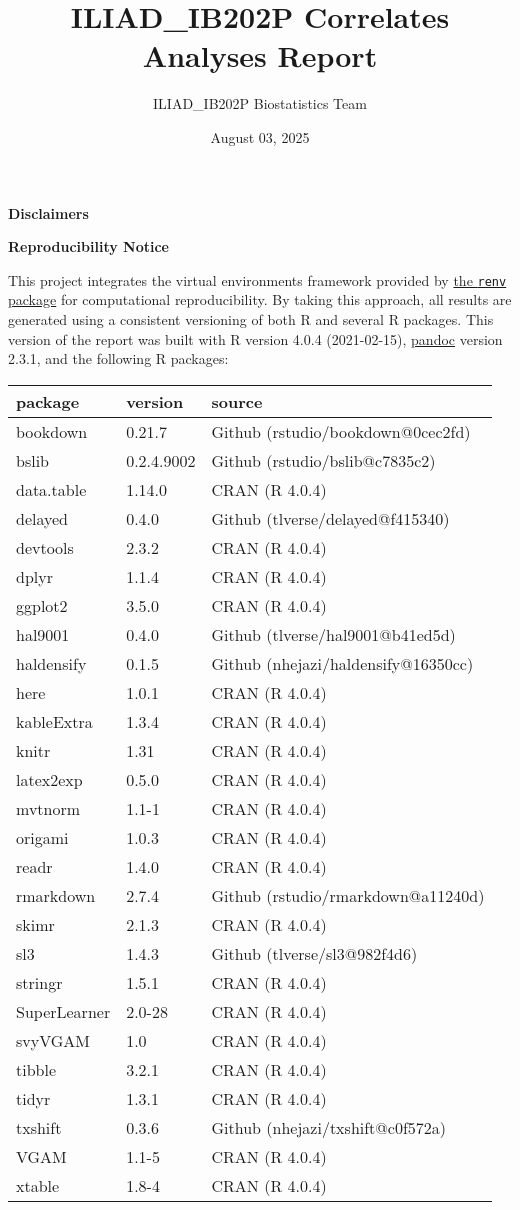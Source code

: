 \documentclass[]{book}
\title{ILIAD\_IB202P Correlates Analyses Report}
\author{ILIAD\_IB202P Biostatistics Team}
\date{August 03, 2025}
\begin{document}
\maketitle

{
\hypersetup{linkcolor=}
\setcounter{tocdepth}{4}
\tableofcontents
}
\listoftables
\listoffigures
\textbf{Disclaimers}

\textbf{Reproducibility Notice}

This project integrates the virtual environments framework provided by \href{https://rstudio.github.io/renv/}{the
\texttt{renv} package} for computational
reproducibility. By taking this approach, all results are generated using a
consistent versioning of both R and several R packages. This version of the
report was built with R version 4.0.4 (2021-02-15), \href{https://pandoc.org/}{pandoc}
version 2.3.1, and the following R packages:

\begin{longtable}[]{@{}lll@{}}
\toprule
package & version & source\tabularnewline
\midrule
\endhead
bookdown & 0.21.7 & Github (rstudio/bookdown@0cec2fd)\tabularnewline
bslib & 0.2.4.9002 & Github (rstudio/bslib@c7835c2)\tabularnewline
data.table & 1.14.0 & CRAN (R 4.0.4)\tabularnewline
delayed & 0.4.0 & Github (tlverse/delayed@f415340)\tabularnewline
devtools & 2.3.2 & CRAN (R 4.0.4)\tabularnewline
dplyr & 1.1.4 & CRAN (R 4.0.4)\tabularnewline
ggplot2 & 3.5.0 & CRAN (R 4.0.4)\tabularnewline
hal9001 & 0.4.0 & Github (tlverse/hal9001@b41ed5d)\tabularnewline
haldensify & 0.1.5 & Github (nhejazi/haldensify@16350cc)\tabularnewline
here & 1.0.1 & CRAN (R 4.0.4)\tabularnewline
kableExtra & 1.3.4 & CRAN (R 4.0.4)\tabularnewline
knitr & 1.31 & CRAN (R 4.0.4)\tabularnewline
latex2exp & 0.5.0 & CRAN (R 4.0.4)\tabularnewline
mvtnorm & 1.1-1 & CRAN (R 4.0.4)\tabularnewline
origami & 1.0.3 & CRAN (R 4.0.4)\tabularnewline
readr & 1.4.0 & CRAN (R 4.0.4)\tabularnewline
rmarkdown & 2.7.4 & Github (rstudio/rmarkdown@a11240d)\tabularnewline
skimr & 2.1.3 & CRAN (R 4.0.4)\tabularnewline
sl3 & 1.4.3 & Github (tlverse/sl3@982f4d6)\tabularnewline
stringr & 1.5.1 & CRAN (R 4.0.4)\tabularnewline
SuperLearner & 2.0-28 & CRAN (R 4.0.4)\tabularnewline
svyVGAM & 1.0 & CRAN (R 4.0.4)\tabularnewline
tibble & 3.2.1 & CRAN (R 4.0.4)\tabularnewline
tidyr & 1.3.1 & CRAN (R 4.0.4)\tabularnewline
txshift & 0.3.6 & Github (nhejazi/txshift@c0f572a)\tabularnewline
VGAM & 1.1-5 & CRAN (R 4.0.4)\tabularnewline
xtable & 1.8-4 & CRAN (R 4.0.4)\tabularnewline
\bottomrule
\end{longtable}
\end{document}

